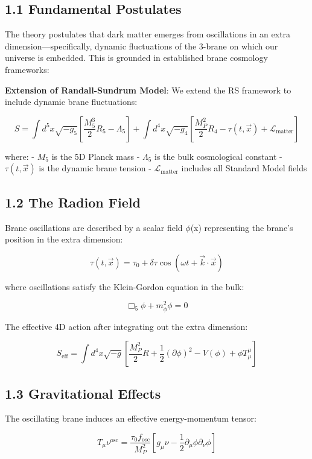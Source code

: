 \documentclass[
  11pt,
]{report}
\begin{document}
\subsection{1.1 Fundamental Postulates}\label{fundamental-postulates}

The theory postulates that dark matter emerges from oscillations in an
extra dimension---specifically, dynamic fluctuations of the 3-brane on
which our universe is embedded. This is grounded in established brane
cosmology frameworks:

\textbf{Extension of Randall-Sundrum Model}: We extend the RS framework
to include dynamic brane fluctuations:

\[S = \int d^5x \sqrt{-g_5} \left[ \frac{M_5^3}{2} R_5 - \Lambda_5 \right] + \int d^4x \sqrt{-g_4} \left[ \frac{M_P^2}{2} R_4 - \tau(t,\vec{x}) + \mathcal{L}_\text{matter} \right]\]

where: - \(M_5\) is the 5D Planck mass - \(\Lambda_5\) is the bulk
cosmological constant - \(\tau(t,\vec{x})\) is the dynamic brane tension
- \(\mathcal{L}_\text{matter}\) includes all Standard Model fields

\subsection{1.2 The Radion Field}\label{the-radion-field}

Brane oscillations are described by a scalar field \(\phi\)(x)
representing the brane's position in the extra dimension:

\[\tau(t,\vec{x}) = \tau_0 + \delta\tau \cos(\omega t + \vec{k} \cdot \vec{x})\]

where oscillations satisfy the Klein-Gordon equation in the bulk:

\[\Box_5 \phi + m_\phi^2 \phi = 0\]

The effective 4D action after integrating out the extra dimension:

\[S_\text{eff} = \int d^4x \sqrt{-g} \left[ \frac{M_P^2}{2} R + \frac{1}{2} (\partial \phi)^2 - V(\phi) + \phi T_\mu^\mu \right]\]

\subsection{1.3 Gravitational Effects}\label{gravitational-effects}

The oscillating brane induces an effective energy-momentum tensor:

\[T_\mu\nu^\text{osc} = \frac{\tau_0 f_\text{osc}}{M_P^2} \left[ g_\mu\nu - \frac{1}{2} \partial_\mu \phi \partial_\nu \phi \right]\]
\end{document}
